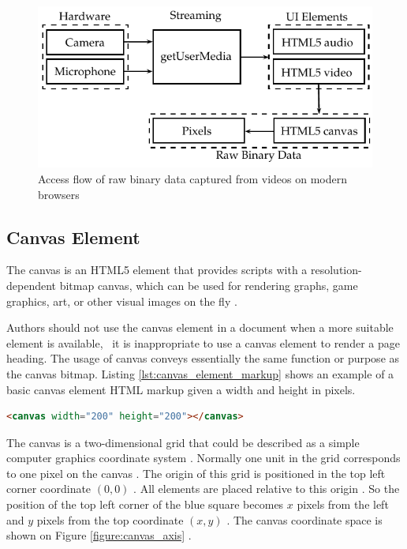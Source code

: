 \begin{figure}[!htb]
  \centering
  \includegraphics{chapters/basic_concepts/get_user_media.pdf}
  \caption{Access flow of raw binary data captured from videos on modern browsers}
  \label{figure:get_user_media}
\end{figure}


\subsection{Canvas Element} %
\label{sub:basic_concepts:web:canvas_element}

The canvas \cite{Canvas2013} is an HTML5 \cite{Hickson2013} element that provides scripts with a resolution-dependent bitmap canvas, which can be used for rendering graphs, game graphics, art, or other visual images on the fly \cite{Canvas2013}.

Authors should not use the canvas element \cite{Canvas2013} in a document when a more suitable element is available, \eg\ it is inappropriate to use a canvas element \cite{Canvas2013} to render a page heading. The usage of canvas conveys essentially the same function or purpose as the canvas bitmap. Listing \ref{lst:canvas_element_markup} shows an example of a basic canvas element \cite{Canvas2013} HTML markup given a width and height in pixels.

\begin{lstlisting}[language=HTML,label={lst:canvas_element_markup},caption=The HTML canvas element markup]
<canvas width="200" height="200"></canvas>
\end{lstlisting}

The canvas \cite{Canvas2013} is a two-dimensional grid that could be described as a simple computer graphics coordinate system \cite{Hartley2004}. Normally one unit in the grid corresponds to one pixel on the canvas \cite{Canvas2013}. The origin of this grid is positioned in the top left corner coordinate $(0,0)$ \cite{Canvas2013}. All elements are placed relative to this origin \cite{Canvas2013}. So the position of the top left corner of the blue square becomes $x$ pixels from the left and $y$ pixels from the top coordinate $(x,y)$ \cite{Canvas2013}. The canvas coordinate space is shown on Figure \ref{figure:canvas_axis} \cite{MDN2013}.

